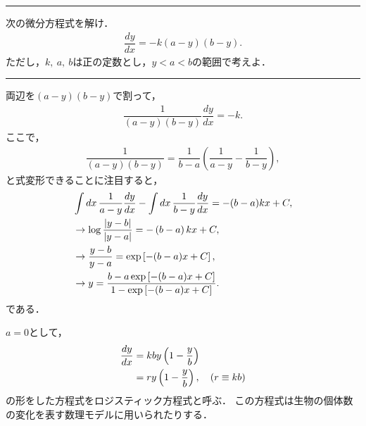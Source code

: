 \newpage
%
\hrule
\reidai
次の微分方程式を解け．
\begin{align}
 \dfrac{dy}{dx} = -k \left(a-y\right)\left(b-y\right). 
\end{align}
ただし，$k,~a,~b$は正の定数とし，$y<a<b$の範囲で考えよ．
\vspace*{.2cm}
\hrule
\vspace*{.2cm}
両辺を$(a-y)(b-y)$で割って，
\begin{align}
 \dfrac{1}{(a-y)(b-y)}\dfrac{dy}{dx} = -k. 
\end{align}
ここで，
\begin{align}
 \dfrac{1}{(a-y)(b-y)} = \dfrac{1}{b-a}\left(\dfrac{1}{a-y} - \dfrac{1}{b-y}\right),
\end{align}
と式変形できることに注目すると，
\begin{align}
 & \int dx\,\dfrac{1}{a-y}\dfrac{dy}{dx} - \int dx\, \dfrac{1}{b-y}\dfrac{dy}{dx}
 =  - (b-a)k x + C, \notag \\
 & \rightarrow \log \dfrac{\left|y-b\right|}{\left|y-a\right|} = -\left(b-a\right)kx + C,
 \notag \\
 & \rightarrow \dfrac{y-b}{y-a} = \exp\left[-(b-a)x + C \right], \notag \\
 & \rightarrow y = \dfrac{b-a\exp\left[-(b-a)x + C\right]}{1-\exp\left[-(b-a)x + C\right]}.
\end{align}
である．\\

$a=0$として，
\begin{align}
 \dfrac{dy}{dx} & = kby\left(1-\dfrac{y}{b}\right) \notag \\
                & = r y \left(1-\dfrac{y}{b}\right), \quad (r \equiv kb) 
\end{align}
の形をした方程式をロジスティック方程式と呼ぶ．
この方程式は生物の個体数の変化を表す数理モデルに用いられたりする．

\newpage
%
